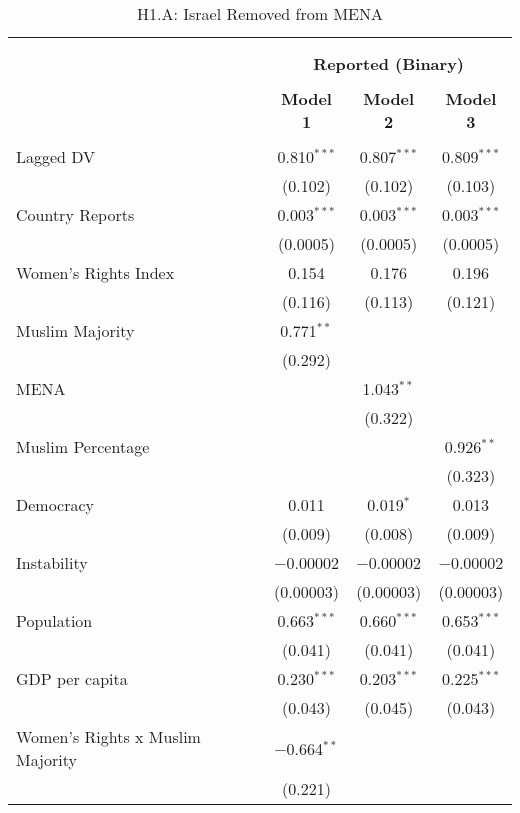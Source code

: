 
\begin{table}[!htbp] \centering 
  \caption{H1.A: Israel Removed from MENA} 
  \label{} 
\begin{tabular}{@{\extracolsep{5pt}}lccc} 
\\[-1.8ex]\hline \\[-1.8ex] 
\\[-1.8ex] & \multicolumn{3}{c}{\textbf{Reported (Binary)}} \\ 
\\[-1.8ex] & \textbf{Model 1} & \textbf{Model 2} & \textbf{Model 3}\\ 
\hline \\[-1.8ex] 
 Lagged DV & 0.810$^{***}$ & 0.807$^{***}$ & 0.809$^{***}$ \\ 
  & (0.102) & (0.102) & (0.103) \\ 
  Country Reports & 0.003$^{***}$ & 0.003$^{***}$ & 0.003$^{***}$ \\ 
  & (0.0005) & (0.0005) & (0.0005) \\ 
  Women's Rights Index & 0.154 & 0.176 & 0.196 \\ 
  & (0.116) & (0.113) & (0.121) \\ 
  Muslim Majority & 0.771$^{**}$ &  &  \\ 
  & (0.292) &  &  \\ 
  MENA &  & 1.043$^{**}$ &  \\ 
  &  & (0.322) &  \\ 
  Muslim Percentage &  &  & 0.926$^{**}$ \\ 
  &  &  & (0.323) \\ 
  Democracy & 0.011 & 0.019$^{*}$ & 0.013 \\ 
  & (0.009) & (0.008) & (0.009) \\ 
  Instability & $-$0.00002 & $-$0.00002 & $-$0.00002 \\ 
  & (0.00003) & (0.00003) & (0.00003) \\ 
  Population & 0.663$^{***}$ & 0.660$^{***}$ & 0.653$^{***}$ \\ 
  & (0.041) & (0.041) & (0.041) \\ 
  GDP per capita & 0.230$^{***}$ & 0.203$^{***}$ & 0.225$^{***}$ \\ 
  & (0.043) & (0.045) & (0.043) \\ 
  Women's Rights x Muslim Majority & $-$0.664$^{**}$ &  &  \\ 
  & (0.221) &  &  \\ 

\end{tabular}
\end{table}
